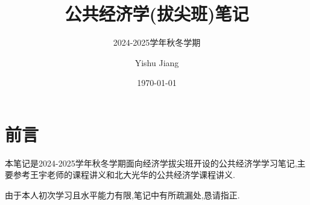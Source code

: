 \documentclass[lang=cn,10pt]{elegantbook}
\title{公共经济学(拔尖班)笔记}
\subtitle{2024-2025学年秋冬学期}
\author{Yishu Jiang}
\institute{School of Economics,Zhejiang University}
\date{\today}
\begin{document}
\maketitle
\frontmatter
\chapter*{前言}
{\fangsong 
    本笔记是2024-2025学年秋冬学期面向经济学拔尖班开设的公共经济学学习笔记,主要参考王宇老师的课程讲义和北大光华的公共经济学课程讲义.

    由于本人初次学习且水平能力有限,笔记中有所疏漏处,恳请指正.
}
\newpage

\tableofcontents

\mainmatter




\end{document}
